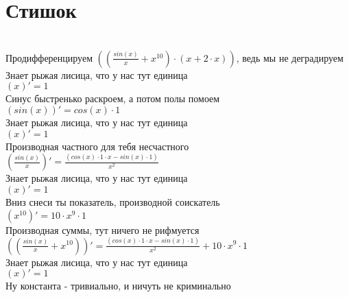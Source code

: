\documentclass[a4paper,12pt]{article}
\begin{document}
\section*{Стишок}\\
Продифференцируем $(( \frac{ sin (x) }{x}  + x ^{10} ) \cdot (x + 2 \cdot x))$, ведь мы не деградируем\\
Знает рыжая лисица, что у нас тут единица\\
\begin{math}
	(x)' = 1
\end{math}\\
Синус быстренько раскроем, а потом полы помоем\\
\begin{math}
	( sin (x) )' =  cos (x)  \cdot 1
\end{math}\\
Знает рыжая лисица, что у нас тут единица\\
\begin{math}
	(x)' = 1
\end{math}\\
Производная частного для тебя несчастного\\
\begin{math}
	( \frac{ sin (x) }{x} )' =  \frac{( cos (x)  \cdot 1 \cdot x -  sin (x)  \cdot 1)}{x ^{2} } 
\end{math}\\
Знает рыжая лисица, что у нас тут единица\\
\begin{math}
	(x)' = 1
\end{math}\\
Вниз снеси ты показатель, производной соискатель\\
\begin{math}
	(x ^{10} )' = 10 \cdot x ^{9}  \cdot 1
\end{math}\\
Производная суммы, тут ничего не рифмуется\\
\begin{math}
	(( \frac{ sin (x) }{x}  + x ^{10} ))' =  \frac{( cos (x)  \cdot 1 \cdot x -  sin (x)  \cdot 1)}{x ^{2} }  + 10 \cdot x ^{9}  \cdot 1
\end{math}\\
Знает рыжая лисица, что у нас тут единица\\
\begin{math}
	(x)' = 1
\end{math}\\
Ну константа - тривиально, и ничуть не криминально\\
\end{document}
